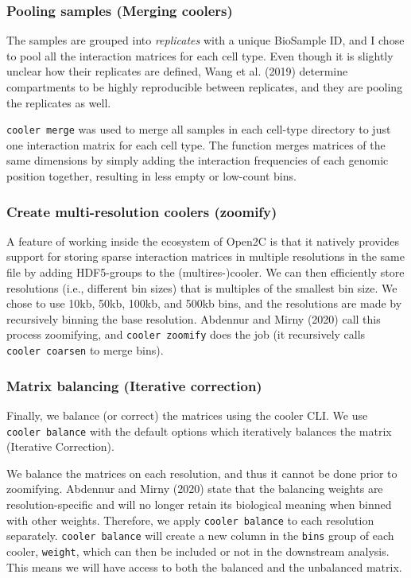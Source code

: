 \documentclass[
  11pt,
  a4paper,
]{scrbook}
\begin{document}
\subsubsection{Pooling samples (Merging
coolers)}\label{pooling-samples-merging-coolers}

The samples are grouped into \emph{replicates} with a unique BioSample
ID, and I chose to pool all the interaction matrices for each cell type.
Even though it is slightly unclear how their replicates are defined,
Wang et al. (2019) determine compartments to be highly reproducible
between replicates, and they are pooling the replicates as well.

\texttt{cooler\ merge} was used to merge all samples in each cell-type
directory to just one interaction matrix for each cell type. The
function merges matrices of the same dimensions by simply adding the
interaction frequencies of each genomic position together, resulting in
less empty or low-count bins.

\subsubsection{Create multi-resolution coolers
(zoomify)}\label{create-multi-resolution-coolers-zoomify}

A feature of working inside the ecosystem of Open2C is that it natively
provides support for storing sparse interaction matrices in multiple
resolutions in the same file by adding HDF5-groups to the
(multires-)cooler. We can then efficiently store resolutions (i.e.,
different bin sizes) that is multiples of the smallest bin size. We
chose to use 10kb, 50kb, 100kb, and 500kb bins, and the resolutions are
made by recursively binning the base resolution. Abdennur and Mirny
(2020) call this process zoomifying, and \texttt{cooler\ zoomify} does
the job (it recursively calls \texttt{cooler\ coarsen} to merge bins).

\subsubsection{Matrix balancing (Iterative
correction)}\label{matrix-balancing-iterative-correction}

Finally, we balance (or correct) the matrices using the cooler CLI. We
use \texttt{cooler\ balance} with the default options which iteratively
balances the matrix (Iterative Correction).

We balance the matrices on each resolution, and thus it cannot be done
prior to zoomifying. Abdennur and Mirny (2020) state that the balancing
weights are resolution-specific and will no longer retain its biological
meaning when binned with other weights. Therefore, we apply
\texttt{cooler\ balance} to each resolution separately.
\texttt{cooler\ balance} will create a new column in the \texttt{bins}
group of each cooler, \texttt{weight}, which can then be included or not
in the downstream analysis. This means we will have access to both the
balanced and the unbalanced matrix.
\end{document}
